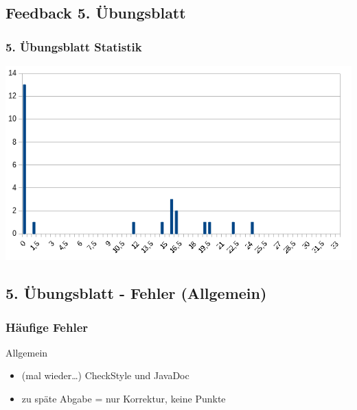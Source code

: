 \documentclass[18pt]{beamer}
\begin{document}
	\subsection{Feedback 5. Übungsblatt}
	\begin{frame}
		\frametitle{5. Übungsblatt Statistik}
		\includegraphics[scale=0.7]{./pics/tut5/statistics-ub5.png}
	\end{frame}

	\subsection{5. Übungsblatt - Fehler (Allgemein)}
	\begin{frame}
		\frametitle{Häufige Fehler}
		\begin{block}{Allgemein}
			\begin{itemize}
				\item (mal wieder\dots) CheckStyle und JavaDoc
				\item zu späte Abgabe = nur Korrektur, keine Punkte
			\end{itemize}
		\end{block}
	\end{frame}
\end{document}

